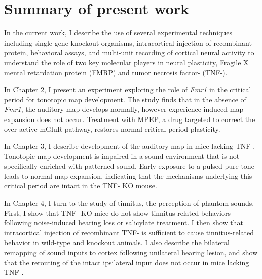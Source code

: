 \section{Summary of present work}

In the current work, I describe the use of several experimental techniques including single-gene knockout organisms, intracortical injection of recombinant protein, behavioral assays, and multi-unit recording of cortical neural activity to understand the role of two key molecular players in neural plasticity, Fragile X mental retardation protein (FMRP) and tumor necrosis factor-\textalpha{} (TNF-\textalpha{}).

In Chapter 2, I present an experiment exploring the role of \textit{Fmr1} in the critical period for tonotopic map development. The study finds that in the absence of \textit{Fmr1}, the auditory map develops normally, however experience-induced map expansion does not occur. Treatment with MPEP, a drug targeted to correct the over-active mGluR pathway, restores normal critical period plasticity.

In Chapter 3, I describe development of the auditory map in mice lacking TNF-\textalpha{}. Tonotopic map development is impaired in a sound environment that is not specifically enriched with patterned sound. Early exposure to a pulsed pure tone leads to normal map expansion, indicating that the mechanisms underlying this critical period are intact in the TNF-\textalpha{} KO mouse.

In Chapter 4, I turn to the study of tinnitus, the perception of phantom sounds. First, I show that TNF-\textalpha{} KO mice do not show tinnitus-related behaviors following noise-induced hearing loss or salicylate treatment. I then show that intracortical injection of recombinant TNF-\textalpha{} is sufficient to cause tinnitus-related behavior in wild-type and knockout animals. I also describe the bilateral remapping of sound inputs to cortex following unilateral hearing lesion, and show that the rerouting of the intact ipsilateral input does not occur in mice lacking TNF-\textalpha{}.

\printbibliography